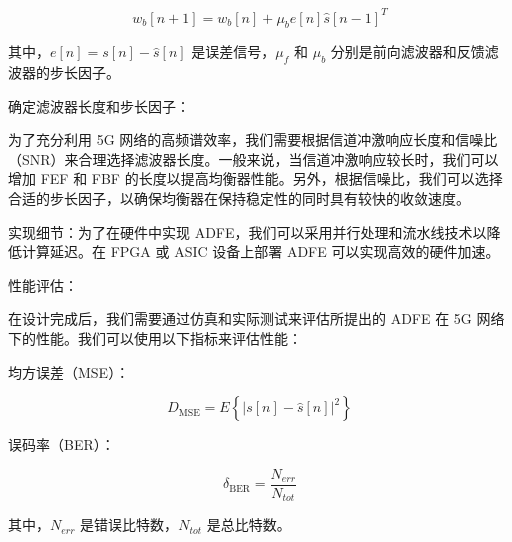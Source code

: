 \documentclass[UTF8,a4paper,12pt]{ctexart}
\numberwithin{equation}{section}
\begin{document}
\begin{equation}
	w_b[n+1] = w_b[n] + \mu_b e[n] \hat{s}[n-1]^{T}
\end{equation}

其中，$e[n] = s[n] - \hat{s}[n]$ 是误差信号，$\mu_f$ 和 $\mu_b$ 分别是前向滤波器和反馈滤波器的步长因子。

确定滤波器长度和步长因子：

为了充分利用 5G 网络的高频谱效率，我们需要根据信道冲激响应长度和信噪比（SNR）来合理选择滤波器长度。一般来说，当信道冲激响应较长时，我们可以增加 FEF 和 FBF 的长度以提高均衡器性能。另外，根据信噪比，我们可以选择合适的步长因子，以确保均衡器在保持稳定性的同时具有较快的收敛速度。

实现细节：为了在硬件中实现 ADFE，我们可以采用并行处理和流水线技术以降低计算延迟。在 FPGA 或 ASIC 设备上部署 ADFE 可以实现高效的硬件加速。

性能评估：

在设计完成后，我们需要通过仿真和实际测试来评估所提出的 ADFE 在 5G 网络下的性能。我们可以使用以下指标来评估性能：

均方误差（MSE）：

\begin{equation}
	D_\text{MSE} = E\left\{ |s[n] - \hat{s}[n]|^2 \right\}
\end{equation}

误码率（BER）：

\begin{equation}
	\delta_\text{BER} = \frac{N_{err}}{N_{tot}}
\end{equation}

其中，$N_{err}$ 是错误比特数，$N_{tot}$ 是总比特数。
\end{document}
